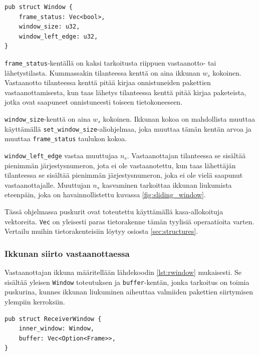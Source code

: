 \documentclass[a4paper,12pt]{article}
\begin{document}
    
\begin{lstlisting}[caption={Ikkunan rakenne}, label={lst:window}]
pub struct Window {
    frame_status: Vec<bool>,
    window_size: u32,
    window_left_edge: u32,
}\end{lstlisting}

\lstinline{frame_status}-kentällä on kaksi tarkoitusta riippuen vastaanotto- tai lähetystilasta. Kummassakin tilanteessa kenttä on aina ikkunan $w_s$ kokoinen. Vastaanotto tilanteessa kenttä pitää kirjaa onnistuneiden pakettien vastaanottamisesta, kun taas lähetys tilanteessa kenttä pitää kirjaa paketeista, jotka ovat saapuneet onnistuneesti toiseen tietokoneeseen.\par

\lstinline{window_size}-kenttä on aina $w_s$ kokoinen. Ikkunan kokoa on mahdollista muuttaa käyttämällä \lstinline{set_window_size}-aliohjelmaa, joka muuttaa tämän kentän arvoa ja muuttaa \lstinline{frame_status} taulukon kokoa.\par

\lstinline{window_left_edge} vastaa muuttujaa $n_s$. Vastaanottajan tilanteessa se sisältää pienimmän järjestysnumeron, jota ei ole vastaanotettu, kun taas lähettäjän tilanteessa se sisältää pienimmän järjestysnumeron, joka ei ole vielä saapunut vastaanottajalle. Muuttujan $n_s$ kasvaminen tarkoittaa ikkunan liukumista eteenpäin, joka on havainnollistettu kuvassa \ref{fig:sliding_window}. 

    \slidingWindow
    
    Tässä ohjelmassa puskurit ovat toteutettu käyttämällä kasa-allokoituja vektoreita. \lstinline{Vec} on yleisesti paras tietorakenne tämän tyylisiä operaatioita varten. Vertailu muihin tietorakenteisiin löytyy osiosta \ref{sec:structures}.

\newpage

    \subsubsection*{Ikkunan siirto vastaanottaessa}




    Vastaanottajan ikkuna määritellään lähdekoodin \ref{lst:rwindow} mukaisesti. Se sisältää yleisen \lstinline{Window} toteutuksen ja \lstinline{buffer}-kentän, jonka tarkoitus on toimia puskurina, kunnes ikkunan liukuminen aiheuttaa valmiiden pakettien siirtymisen ylempiin kerroksiin. \par
    
\begin{lstlisting}[caption={Vastaanottajan ikkunan rakenne}, label={lst:rwindow}]
pub struct ReceiverWindow {
    inner_window: Window,
    buffer: Vec<Option<Frame>>,
}\end{lstlisting}
\end{document}

